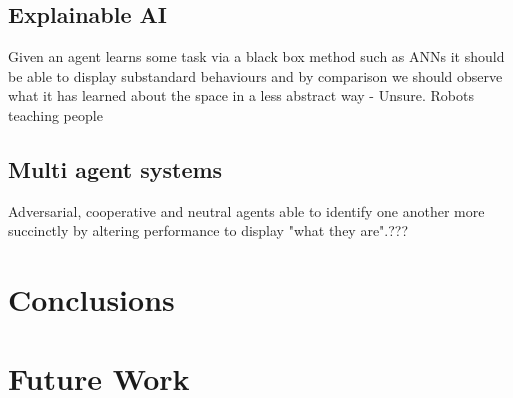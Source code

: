 \documentclass[10pt,technote]{IEEEtran}
\begin{document}
\subsection{Explainable AI}
Given an agent learns some task via a black box method such as ANNs it should be able to display substandard behaviours and by comparison we should observe what it has learned about the space in a less abstract way - Unsure. Robots teaching people

\subsection{Multi agent systems}
Adversarial, cooperative and neutral agents able to identify one another more succinctly by altering performance to display "what they are".???


\section{Conclusions} \label{sect:conclusions}

\section{Future Work} \label{sect:future}



\end{document}

